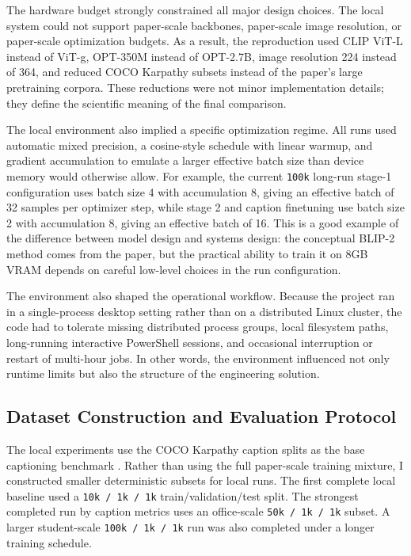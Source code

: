 \documentclass[11pt]{article}
\begin{document}
The hardware budget strongly constrained all major design choices. The local system could not support paper-scale backbones, paper-scale image resolution, or paper-scale optimization budgets. As a result, the reproduction used CLIP ViT-L instead of ViT-g, OPT-350M instead of OPT-2.7B, image resolution 224 instead of 364, and reduced COCO Karpathy subsets instead of the paper's large pretraining corpora. These reductions were not minor implementation details; they define the scientific meaning of the final comparison.

The local environment also implied a specific optimization regime. All runs used automatic mixed precision, a cosine-style schedule with linear warmup, and gradient accumulation to emulate a larger effective batch size than device memory would otherwise allow. For example, the current \texttt{100k} long-run stage-1 configuration uses batch size 4 with accumulation 8, giving an effective batch of 32 samples per optimizer step, while stage 2 and caption finetuning use batch size 2 with accumulation 8, giving an effective batch of 16. This is a good example of the difference between model design and systems design: the conceptual BLIP-2 method comes from the paper, but the practical ability to train it on 8GB VRAM depends on careful low-level choices in the run configuration.

The environment also shaped the operational workflow. Because the project ran in a single-process desktop setting rather than on a distributed Linux cluster, the code had to tolerate missing distributed process groups, local filesystem paths, long-running interactive PowerShell sessions, and occasional interruption or restart of multi-hour jobs. In other words, the environment influenced not only runtime limits but also the structure of the engineering solution.

\subsection{Dataset Construction and Evaluation Protocol}
The local experiments use the COCO Karpathy caption splits as the base captioning benchmark \citep{lin2014coco}. Rather than using the full paper-scale training mixture, I constructed smaller deterministic subsets for local runs. The first complete local baseline used a \texttt{10k / 1k / 1k} train/validation/test split. The strongest completed run by caption metrics uses an office-scale \texttt{50k / 1k / 1k} subset. A larger student-scale \texttt{100k / 1k / 1k} run was also completed under a longer training schedule.
\end{document}
